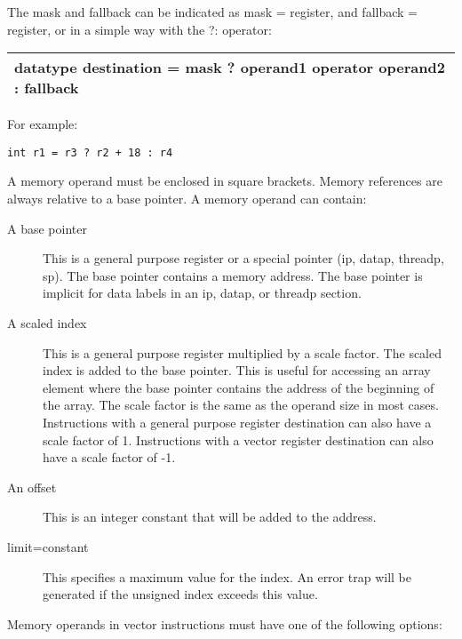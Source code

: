 \documentclass[forwardcom.tex]{subfiles}
\begin{document}
The mask and fallback can be indicated as mask = register, and fallback = register, 
or in a simple way with the ?: operator:
\vv

\begin{tabular}{|p{140mm}|}
\hline
\hspace{4mm} datatype destination = mask ? operand1 operator operand2 : fallback\\
\hline
\end{tabular}
\vspace{4mm}

For example:
\begin{lstlisting}[frame=single]
int r1 = r3 ? r2 + 18 : r4
\end{lstlisting}
\vv

A memory operand must be enclosed in square brackets. Memory references are always relative to a base pointer. 
A memory operand can contain:
\vv

\begin{description}

\item[A base pointer]
This is a general purpose register or a special pointer (ip, datap, threadp, sp). The base pointer contains a memory address. 
The base pointer is implicit for data labels in an ip, datap, or threadp section.

\item[A scaled index]
This is a general purpose register multiplied by a scale factor. 
The scaled index is added to the base pointer. This is useful for accessing an array element where the base pointer contains the address of the beginning of the array. 
The scale factor is the same as the operand size in most cases. Instructions with a general purpose register destination can also have a scale factor of 1. Instructions with a vector register destination can also have a scale factor of -1.

\item[An offset]
This is an integer constant that will be added to the address.

\item[limit=constant]
This specifies a maximum value for the index. An error trap will be generated if the unsigned index exceeds this value.

\end{description}

Memory operands in vector instructions must have one of the following options:
\end{document}
